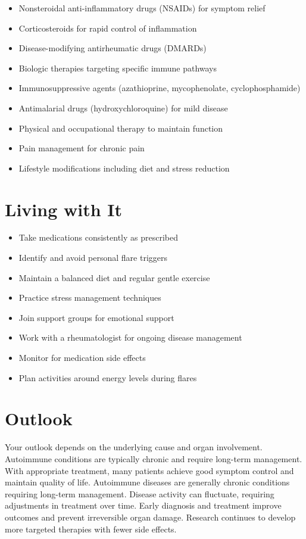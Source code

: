 \begin{itemize}[noitemsep]
  \item Nonsteroidal anti-inflammatory drugs (NSAIDs) for symptom relief
  \item Corticosteroids for rapid control of inflammation
  \item Disease-modifying antirheumatic drugs (DMARDs)
  \item Biologic therapies targeting specific immune pathways
  \item Immunosuppressive agents (azathioprine, mycophenolate, cyclophosphamide)
  \item Antimalarial drugs (hydroxychloroquine) for mild disease
  \item Physical and occupational therapy to maintain function
  \item Pain management for chronic pain
  \item Lifestyle modifications including diet and stress reduction
\end{itemize}
\section{Living with It}
\begin{itemize}[noitemsep]
  \item Take medications consistently as prescribed
  \item Identify and avoid personal flare triggers
  \item Maintain a balanced diet and regular gentle exercise
  \item Practice stress management techniques
  \item Join support groups for emotional support
  \item Work with a rheumatologist for ongoing disease management
  \item Monitor for medication side effects
  \item Plan activities around energy levels during flares
\end{itemize}
\section{Outlook}
Your outlook depends on the underlying cause and organ involvement. Autoimmune conditions are typically chronic and require long-term management. With appropriate treatment, many patients achieve good symptom control and maintain quality of life. Autoimmune diseases are generally chronic conditions requiring long-term management. Disease activity can fluctuate, requiring adjustments in treatment over time. Early diagnosis and treatment improve outcomes and prevent irreversible organ damage. Research continues to develop more targeted therapies with fewer side effects.
